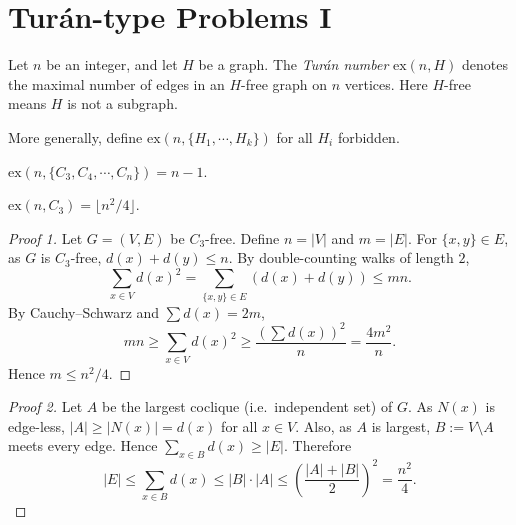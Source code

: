 \documentclass[11pt, a4paper]{ctexrep}
\begin{document}
\section{Tur\'an-type Problems I}

\begin{definition}
    Let $n$ be an integer, and let $H$ be a graph. The \emph{Tur\'an number} $\mathrm{ex}(n,H)$ denotes the maximal number of edges in an $H$-free graph on $n$ vertices. Here $H$-free means $H$ is not a subgraph.

    More generally, define $\mathrm{ex}(n,\{H_1,\cdots,H_k\})$ for all $H_i$ forbidden.
\end{definition}


\begin{lemma}
    $\mathrm{ex}(n,\{C_3,C_4,\cdots,C_n\})=n-1$.
\end{lemma}

\begin{proposition}[Mantel, 1907]
    $\mathrm{ex}(n,C_3)=\lfloor n^2/4\rfloor$.
\end{proposition}

\begin{proof}[Proof 1]
    Let $G=(V,E)$ be $C_3$-free. Define $n=|V|$ and $m=|E|$. For $\{x,y\}\in E$, as $G$ is $C_3$-free, $d(x)+d(y)\leqslant n$. By double-counting walks of length $2$,
    \[
        \sum_{x\in V}d(x)^2=\sum_{\{x,y\}\in E}(d(x)+d(y))\leqslant mn.
    \]
    By Cauchy--Schwarz and $\sum d(x)=2m$,
    \[
        mn\geqslant\sum_{x\in V}d(x)^2\geqslant\frac{\left(\sum d(x)\right)^2}{n}=\frac{4m^2}{n}.
    \]
    Hence $m\leqslant n^2/4$.
\end{proof}

\begin{proof}[Proof 2]
    Let $A$ be the largest coclique (i.e.\ independent set) of $G$. As $N(x)$ is edge-less, $|A|\geqslant |N(x)| =d(x)$ for all $x\in V$. Also, as $A$ is largest, $B:=V\setminus A$ meets every edge. Hence $\sum_{x\in B}d(x)\geqslant |E|$. Therefore
    \[
        |E|\leqslant \sum_{x\in B}d(x)\leqslant |B|\cdot |A|\leqslant\left(\frac{|A|+|B|}{2}\right)^2=\frac{n^2}{4}.
    \]
\end{proof}
\end{document}
